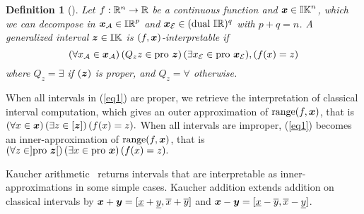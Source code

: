 \documentclass{sig-alternate-05-2015}
\newtheorem{definition}{Definition}
\DeclareMathOperator{\range}{range}
\newcommand{\pro}{\mbox{pro }}
\def\bbr{{\Bbb R}}
\def\I{{\Bbb I \Bbb R}}
\def\K{{\Bbb I \Bbb K}}
\begin{document}
\begin{definition} [\cite{gold1}]
\label{pb1}
Let $f : \bbr^n \rightarrow \bbr$ be a continuous function and $\x \in \K^n$, which we can decompose in $\x_{\cal A} \in \I^p$ 
and $\x_{\cal E} \in (\mbox{dual }\I)^q$ with $p+q=n$. A generalized interval 
$\z \in \K$ is $(f,\x)$-interpretable if
\begin{equation}
 (\forall x_{\cal A} \in \x_{\cal A})\, (Q_z z \in \pro \z)\, (\exists x_{\cal E} \in \pro \x_{\cal E}),
(f(x)=z)
\label{eq1}
\end{equation}
where $Q_z = \exists$ if $(\z)$ is proper, and  $Q_z = \forall$ otherwise. 
\end{definition}

When all intervals in (\ref{eq1}) are proper, we retrieve the interpretation of classical interval 
computation, which gives an outer approximation of $\range(f,\x)$, that is
$ (\forall x \in \x) \, (\exists z \in [\z]) \, (f(x)=z).    $
When all intervals are improper, (\ref{eq1}) becomes an inner-approx\-imation  of $\range(f,\x)$, that is
$ (\forall z \in ]\pro \z[) \, (\exists x \in \pro \x) \, (f(x)=z).    $

 Kaucher arithmetic~\cite{Kaucher} returns intervals that are interpretable as inner-approximations in some simple cases. 
Kau\-cher addition extends addition on classical intervals by $\x+\y=[\underline x + \underline y,\overline x + \overline y]$ and 
$\x-\y=[\underline x - \overline y,\overline x - \underline y]$.
\end{document}
